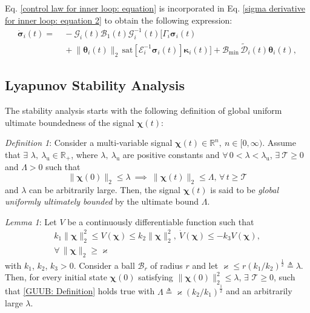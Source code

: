 \documentclass[lettersize,journal]{IEEEtran}
\begin{document}
Eq. \eqref{control law for inner loop: equation} is incorporated in Eq. \eqref{sigma derivative for inner loop: equation 2} to obtain the following expression:
\begin{align}
    \label{sigma derivative for inner loop: equation 3}
    \dot{\boldsymbol{\sigma}}_i(t) =&~ - \mathcal{G}_i(t) \mathcal{B}_{1}(t) \mathcal{G}_i^{-1}(t) \big[\Gamma_i \boldsymbol{\sigma}_i(t) \nonumber \\ 
    & ~ + \lVert \boldsymbol{\theta}_i(t) \rVert_2 \, \text{sat}[ \mathcal{E}_i^{-1}\boldsymbol{\sigma}_i(t)] \boldsymbol{\kappa}_i(t)\big] + \mathcal{B}_{\text{min}} \, \tilde{\mathcal{D}}_i(t) \boldsymbol{\theta}_i(t),
\end{align}

\subsection{Lyapunov Stability Analysis}
The stability analysis starts with the following definition of global uniform ultimate boundedness of the signal $\boldsymbol{\chi}(t)$:

\textit{Definition 1}:
 Consider a multi-variable signal $\boldsymbol{\chi}(t) \in \mathbb{R}^n, ~n \in [0, \infty)$. Assume that $\exists$ $\lambda, ~ \lambda_{\text{u}} \in \mathbb{R}_+$, where $\lambda, ~ \lambda_{\text{u}}$ are positive constants and $\forall \, 0 < \lambda < \lambda_{\text{u}}$, $\exists ~ \mathcal{T} \geq 0$ and $\Lambda > 0$ such that
\begin{equation} \label{GUUB: Definition}
    \lVert \boldsymbol{\chi}(0) \rVert_2 \leq \lambda ~\implies~ \lVert \boldsymbol{\chi}(t) \rVert_2 \leq \Lambda,  \, \forall \, t \geq \mathcal{T}
\end{equation}
\noindent and $\lambda$ can be arbitrarily large. Then, the signal $\boldsymbol{\chi}(t)$ is said to be \textit{global uniformly ultimately bounded} by the ultimate bound $\Lambda$.

\textit{Lemma 1}:
Let $V$ be a continuously differentiable function such that 
\begin{align}
    k_1 \lVert \boldsymbol{\chi} \rVert^2_2 \leq V(\boldsymbol{\chi}) \leq k_2 \lVert \boldsymbol{\chi} \rVert^2_2, ~ \dot{V}(\boldsymbol{\chi}) \leq - k_3 V(\boldsymbol{\chi}),\\ \forall \, \lVert \boldsymbol{\chi} \rVert_2 \geq \varkappa \nonumber
\end{align}
\noindent with $k_1$, $k_2$, $k_3 > 0$. Consider a ball $\mathcal{B}_r$ of radius $r$ and let $\varkappa \leq r (k_1/k_2)^{\frac{1}{2}} \triangleq \lambda$.
\noindent Then, for every initial state $\boldsymbol{\chi}(0)$ satisfying $\lVert \boldsymbol{\chi}(0) \rVert^2_2 \leq \lambda$, $\exists$ $\mathcal{T} \geq 0$, such that \eqref{GUUB: Definition} holds true with $\Lambda \triangleq \varkappa (k_2/k_1)^{\frac{1}{2}}$ and an arbitrarily large $\lambda$. 
\end{document}

